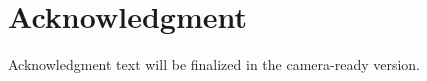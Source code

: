 \documentclass[conference]{IEEEtran}
\begin{document}
\section*{Acknowledgment}
Acknowledgment text will be finalized in the camera-ready version.



\end{document}
